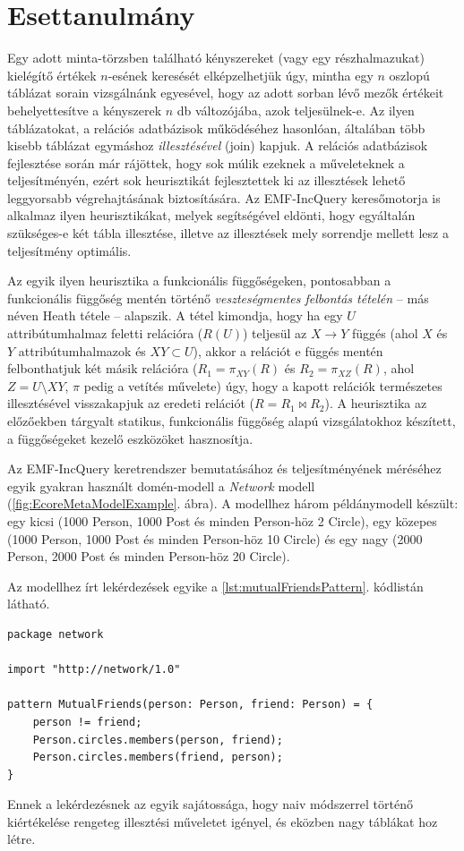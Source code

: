 
\section{Esettanulmány}
\label{sect:caseStudy}

Egy adott minta-törzsben található kényszereket (vagy egy részhalmazukat) kielégítő értékek $n$-esének keresését elképzelhetjük úgy, mintha egy $n$ oszlopú táblázat sorain vizsgálnánk egyesével, hogy az adott sorban lévő mezők értékeit behelyettesítve a kényszerek $n$ db változójába, azok teljesülnek-e.
Az ilyen táblázatokat, a relációs adatbázisok működéséhez hasonlóan, általában több kisebb táblázat egymáshoz \emph{illesztésével} (join) kapjuk.
A relációs adatbázisok fejlesztése során már rájöttek, hogy sok múlik ezeknek a műveleteknek a teljesítményén, ezért sok heurisztikát fejlesztettek ki az illesztések lehető leggyorsabb végrehajtásának biztosítására.
Az EMF-IncQuery keresőmotorja is alkalmaz ilyen heurisztikákat, melyek segítségével eldönti, hogy egyáltalán szükséges-e két tábla illesztése, illetve az illesztések mely sorrendje mellett lesz a teljesítmény optimális.

Az egyik ilyen heurisztika a funkcionális függőségeken, pontosabban a funkcionális függőség mentén történő \emph{veszteségmentes felbontás tételén} -- más néven Heath tétele -- alapszik.
A tétel kimondja, hogy ha egy $U$ attribútumhalmaz feletti relációra ($R(U)$) teljesül az $X \rightarrow Y$ függés (ahol $X$ és $Y$ attribútumhalmazok és $XY \subset U$), akkor a relációt e függés mentén felbonthatjuk két másik relációra ($R_1 = \pi_{XY}(R)$ és $R_2 = \pi_{XZ}(R)$, ahol $Z = U \setminus XY$, $\pi$ pedig a vetítés művelete) úgy, hogy a kapott relációk természetes illesztésével visszakapjuk az eredeti relációt ($R = R_1 \bowtie R_2$).
A heurisztika az előzőekben tárgyalt statikus, funkcionális függőség alapú vizsgálatokhoz készített, a függőségeket kezelő eszközöket hasznosítja.

Az EMF-IncQuery keretrendszer bemutatásához és teljesítményének méréséhez egyik gyakran használt domén-modell a \emph{Network} modell (\ref{fig:EcoreMetaModelExample}. ábra).
A modellhez három példánymodell készült: egy kicsi (1000 Person, 1000 Post és minden Person-höz 2 Circle), egy közepes (1000 Person, 1000 Post és minden Person-höz 10 Circle) és egy nagy (2000 Person, 2000 Post és minden Person-höz 20 Circle).

Az modellhez írt lekérdezések egyike a \ref{lst:mutualFriendsPattern}. kódlistán látható.
\begin{lstlisting}[float,floatplacement=htb,caption=MutualFriends minta,label=lst:mutualFriendsPattern]
package network

import "http://network/1.0"

pattern MutualFriends(person: Person, friend: Person) = {
	person != friend;
	Person.circles.members(person, friend);
	Person.circles.members(friend, person);
}
\end{lstlisting}
Ennek a lekérdezésnek az egyik sajátossága, hogy naiv módszerrel történő kiértékelése rengeteg illesztési műveletet igényel, és eközben nagy táblákat hoz létre.

